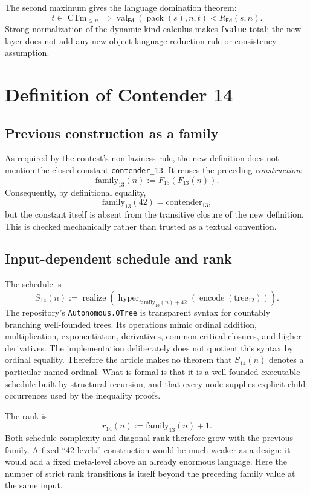 \documentclass[11pt]{article}
\theoremstyle{definition}
\newcommand{\Fd}{\mathsf{Fd}}
\newcommand{\code}[1]{\texttt{#1}}
\begin{document}
The second maximum gives the language domination theorem:
\[
 t\in\operatorname{CTm}_{\le n}
 \Longrightarrow
 \operatorname{val}_{\Fd}(\operatorname{pack}(s),n,t)<R_{\Fd}(s,n).
\]
Strong normalization of the dynamic-kind calculus makes \code{fvalue} total; the new layer does not add any new object-language reduction rule or consistency assumption.

\section{Definition of Contender 14}

\subsection{Previous construction as a family}

As required by the contest's non-laziness rule, the new definition does not mention the closed constant \code{contender\_13}.  It reuses the preceding \emph{construction}:
\[
  \mathrm{family}_{13}(n):=F_{13}(F_{13}(n)).
\]
Consequently, by definitional equality,
\[
  \mathrm{family}_{13}(42)=\mathrm{contender}_{13},
\]
but the constant itself is absent from the transitive closure of the new definition.  This is checked mechanically rather than trusted as a textual convention.

\subsection{Input-dependent schedule and rank}

The schedule is
\[
 S_{14}(n):=\operatorname{realize}\!\left(
   \operatorname{hyper}_{\mathrm{family}_{13}(n)+42}
    (\operatorname{encode}(\mathrm{tree}_{12}))
 \right).
\]
The repository's \code{Autonomous.OTree} is transparent syntax for countably branching well-founded trees.  Its operations mimic ordinal addition, multiplication, exponentiation, derivatives, common critical closures, and higher derivatives.  The implementation deliberately does not quotient this syntax by ordinal equality.  Therefore the article makes no theorem that $S_{14}(n)$ denotes a particular named ordinal.  What is formal is that it is a well-founded executable schedule built by structural recursion, and that every node supplies explicit child occurrences used by the inequality proofs.

The rank is
\[
 r_{14}(n):=\mathrm{family}_{13}(n)+1.
\]
Both schedule complexity and diagonal rank therefore grow with the previous family.  A fixed ``42 levels'' construction would be much weaker as a design: it would add a fixed meta-level above an already enormous language.  Here the number of strict rank transitions is itself beyond the preceding family value at the same input.
\end{document}
